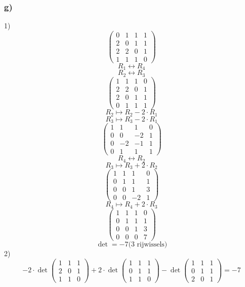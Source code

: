 \documentclass[lineaire_algebra_oplossingen.tex]{subfiles}
\begin{document}
\subsubsection*{g)}
1)
\[
\begin{pmatrix}
0 & 1 & 1 & 1\\
2 & 0 & 1 & 1\\
2 & 2 & 0 & 1\\
1 & 1 & 1 & 0
\end{pmatrix}
\]
\[R_1 \leftrightarrow R_4\]
\[R_2 \leftrightarrow R_3\]
\[
\begin{pmatrix}
1 & 1 & 1 & 0\\
2 & 2 & 0 & 1\\
2 & 0 & 1 & 1\\
0 & 1 & 1 & 1
\end{pmatrix}
\]
\[R_2 \longmapsto R_2- 2 \cdot R_1 \]
\[R_3 \longmapsto R_3- 2 \cdot R_1 \]
\[
\begin{pmatrix}
1 & 1 & 1 & 0\\
0 & 0 & -2 & 1\\
0 & -2 & -1 & 1\\
0 & 1 & 1 & 1
\end{pmatrix}
\]
\[R_4 \leftrightarrow R_2\]
\[R_3 \longmapsto R_3 + 2 \cdot R_2\]
\[
\begin{pmatrix}
1 & 1 & 1 & 0\\
0 & 1 & 1 & 1\\
0 & 0 & 1 & 3\\
0 & 0 & -2 & 1
\end{pmatrix}
\]
\[R_4 \longmapsto R_4 + 2 \cdot R_3\]
\[
\begin{pmatrix}
1 & 1 & 1 & 0\\
0 & 1 & 1 & 1\\
0 & 0 & 1 & 3\\
0 & 0 & 0 & 7
\end{pmatrix}
\]
\[\det = -7 \text{(3 rijwissels)} \]
2)
\[ -2 \cdot \det
\begin{pmatrix}
1 & 1 & 1\\
2 & 0 & 1\\
1 & 1 & 0
\end{pmatrix}
+2 \cdot \det
\begin{pmatrix}
1 & 1 & 1\\
0 & 1 & 1\\
1 & 1 & 0
\end{pmatrix}
- \det 
\begin{pmatrix}
1 & 1 & 1\\
0 & 1 & 1\\
2 & 0 & 1
\end{pmatrix}
=-7
\]
\end{document}
